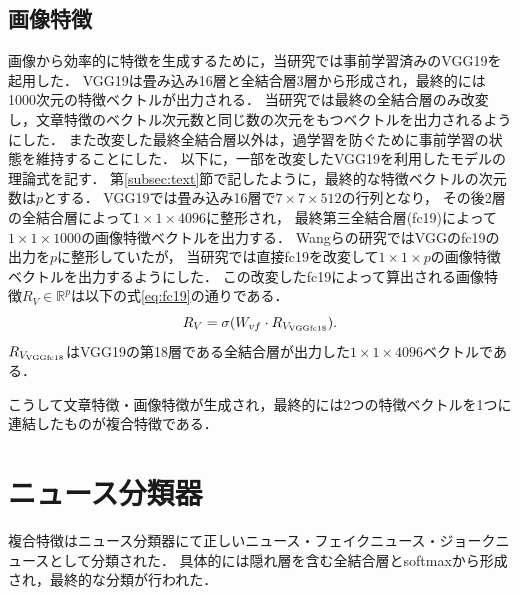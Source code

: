 \subsection{画像特徴}
画像から効率的に特徴を生成するために，当研究では事前学習済みのVGG19\cite{DBLP:journals/corr/SimonyanZ14a}を起用した．
VGG19は畳み込み16層と全結合層3層から形成され，最終的には1000次元の特徴ベクトルが出力される．
当研究では最終の全結合層のみ改変し，文章特徴のベクトル次元数と同じ数の次元をもつベクトルを出力されるようにした．
また改変した最終全結合層以外は，過学習を防ぐために事前学習の状態を維持することにした．
以下に，一部を改変したVGG19を利用したモデルの理論式を記す．
第\ref{subsec:text}節で記したように，最終的な特徴ベクトルの次元数は$p$とする．
VGG19では畳み込み16層で$7 \times 7 \times 512$の行列となり，
その後2層の全結合層によって$1 \times 1 \times 4096$に整形され，
最終第三全結合層(fc19)によって$1 \times 1 \times 1000$の画像特徴ベクトルを出力する．
Wangらの研究\cite{Wang:2018:EEA:3219819.3219903}ではVGGのfc19の出力を$p$に整形していたが，
当研究では直接fc19を改変して$1 \times 1 \times p$の画像特徴ベクトルを出力するようにした．
この改変したfc19によって算出される画像特徴$R_V \in \mathbb{R}^p$は以下の式\ref{eq:fc19}の通りである．
\begin{equation}
    \label{eq:fc19}
    R_V = \sigma(W_{vf} \cdot R_{V_{\rm VGGfc18}}).
\end{equation}
$R_{V_{\rm VGGfc18}}$はVGG19の第18層である全結合層が出力した$1 \times 1 \times 4096$ベクトルである．

こうして文章特徴・画像特徴が生成され，最終的には2つの特徴ベクトルを1つに連結したものが複合特徴である．
%
\section{ニュース分類器}
%
複合特徴はニュース分類器にて正しいニュース・フェイクニュース・ジョークニュースとして分類された．
具体的には隠れ層を含む全結合層とsoftmaxから形成され，最終的な分類が行われた．




%
%
\newpage
%
%
%
%
%
%
%
%
%
%
% 
